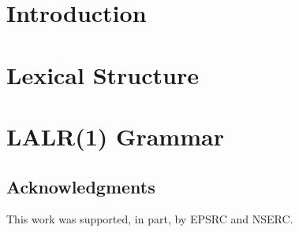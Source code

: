 \documentclass[11pt]{article}
\title{\mytitle}
\author{\myauthors}
\def\myack{This work was supported, in part, by EPSRC and NSERC.}
\begin{document}
\maketitle

\begin{abstract}

\end{abstract}

\section{Introduction \label{INTRODUCTION}}


\section{Lexical Structure \label{LEXICAL}}


\section{LALR(1) Grammar \label{GRAMMAR}}


\subsection*{Acknowledgments}
\myack



\end{document}
